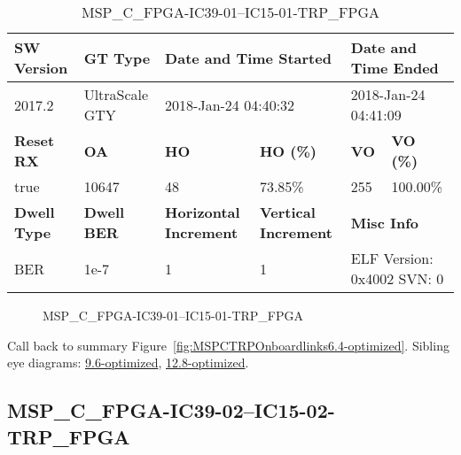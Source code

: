 \begin{table}[h]
\centering
\caption{MSP\_C\_FPGA-IC39-01--IC15-01-TRP\_FPGA}
\label{tab:MSPCFPGAIC3901IC1501TRPFPGA6.4-optimized}
\begin{tabular}{@{}|l|l|l|l|l|l|@{}}
\toprule
\textbf{SW Version}                & \textbf{GT Type}   & \multicolumn{2}{l|}{\textbf{Date and Time Started}}            & \multicolumn{2}{l|}{\textbf{Date and Time Ended}}        \\ \midrule
2017.2                       & UltraScale GTY          & \multicolumn{2}{l|}{2018-Jan-24 04:40:32}                   & \multicolumn{2}{l|}{2018-Jan-24 04:41:09}               \\ \midrule
\textbf{Reset RX}                  & \textbf{OA} & \textbf{HO}   & \textbf{HO (\%)} & \textbf{VO} & \textbf{VO (\%)} \\ \midrule
true & 10647        & 48          & 73.85\%        & 255        & 100.00\%       \\ \midrule
\textbf{Dwell Type}                & \textbf{Dwell BER} & \textbf{Horizontal Increment} & \textbf{Vertical Increment}    & \multicolumn{2}{l|}{\textbf{Misc Info}}                  \\ \midrule
BER                            & 1e-7        & 1        & 1           & \multicolumn{2}{l|}{ELF Version: 0x4002 SVN: 0}                         \\ \bottomrule
\end{tabular}
\end{table}

\begin{figure}[h]
\caption{MSP\_C\_FPGA-IC39-01--IC15-01-TRP\_FPGA} \label{fig:MSPCFPGAIC3901IC1501TRPFPGA6.4-optimized}
\end{figure}

Call back to summary Figure~\ref{fig:MSPCTRPOnboardlinks6.4-optimized}.
Sibling eye diagrams: \hyperref[sec:MSPCFPGAIC3901IC1501TRPFPGA9.6-optimized]{9.6-optimized}, \hyperref[sec:MSPCFPGAIC3901IC1501TRPFPGA12.8-optimized]{12.8-optimized}.

\clearpage
\newpage


\subsection{MSP\_C\_FPGA-IC39-02--IC15-02-TRP\_FPGA}\label{sec:MSPCFPGAIC3902IC1502TRPFPGA6.4-optimized}

